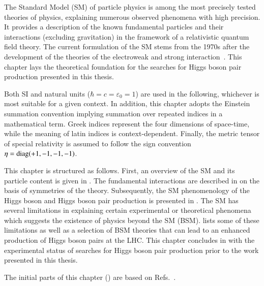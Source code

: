 The Standard Model (SM) of particle physics is among the most precisely tested
theories of physics, explaining numerous observed phenomena with high
precision. It provides a description of the known fundamental particles and
their interactions (excluding gravitation) in the framework of a relativistic
quantum field theory. The current formulation of the SM stems from the 1970s
after the development of the theories of the electroweak and strong
interaction~\cite{Glashow:1961tr,Salam:1964ry,Weinberg:1967tq,Englert:1964et,Higgs:1964pj,tHooft:1971qjg,Fritzsch:1973pi,Gross:1973id,Politzer:1973fx}.
This chapter lays the theoretical foundation for the searches for Higgs boson
pair production presented in this thesis.

Both SI and natural units ($\hbar = c = \varepsilon_0 = 1$) are used in the
following, whichever is most suitable for a given context. In addition, this
chapter adopts the Einstein summation convention implying summation over
repeated indices in a mathematical term. Greek indices represent the four
dimensions of space-time, while the meaning of latin indices is
context-dependent. Finally, the metric tensor of special relativity is assumed
to follow the sign convention $\eta = \operatorname{diag}(+1, -1, -1, -1)$.

This chapter is structured as follows. First, an overview of the SM and its
particle content is given in . The fundamental
interactions are described in  on the
basis of symmetries of the theory. Subsequently, the SM phenomenology of the
Higgs boson and Higgs boson pair production is presented in
. The SM has several limitations in explaining certain
experimental or theoretical phenomena which suggests the existence of physics
beyond the SM (BSM).  lists some of these limitations as well as a
selection of BSM theories that can lead to an enhanced production of Higgs boson
pairs at the LHC. This chapter concludes in  with
the experimental status of searches for Higgs boson pair production prior to the
work presented in this thesis.

The initial parts of this chapter
() are based on
Refs.~\cite{Halzen:1984mc,Thomson:2013zua,Djouadi:2005gi}.

